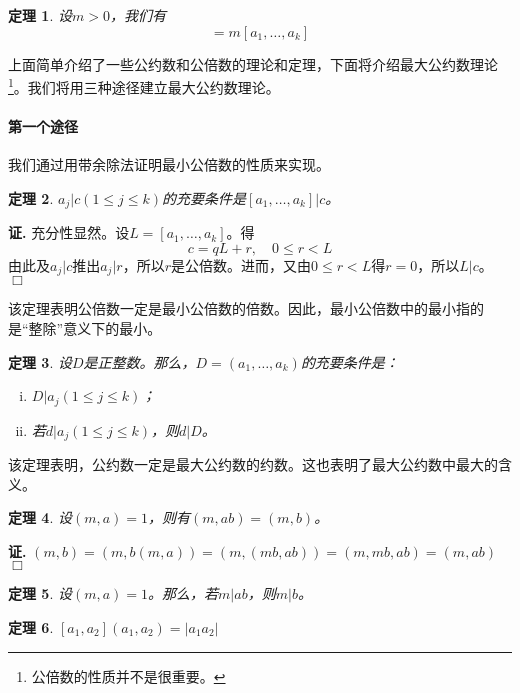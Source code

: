 \documentclass{ctexrep}
\newcommand{\aabs}[1]{{ \left| #1 \right| }}
\newtheorem{thrm}{定理}[section]
\renewenvironment{proof}[1][证]{\noindent \textbf{#1.} }{\hfill$\Box$}
\begin{document}
\begin{thrm}
设$m>0$，我们有
\begin{displaymath}
[ma_1,\dotsc,ma_k]=m[a_1,\dotsc,a_k]
\end{displaymath}
\end{thrm}

上面简单介绍了一些公约数和公倍数的理论和定理，下面将介绍最大公约数理论\footnote{公倍数的性质并不是很重要。}。我们将用三种途径建立最大公约数理论。

\paragraph{第一个途径}
我们通过用带余除法证明最小公倍数的性质来实现。

\begin{thrm}
$a_j|c(1\leq j\leq k)$的充要条件是$[a_1,\dotsc,a_k]|c$。
\end{thrm}
\begin{proof}
充分性显然。设$L=[a_1,\dotsc,a_k]$。得
\begin{displaymath}
c=qL+r,\quad 0\leq r<L
\end{displaymath}
由此及$a_j|c$推出$a_j|r$，所以$r$是公倍数。进而，又由$0\leq r<L$得$r=0$，所以$L|c$。
\end{proof}

该定理表明公倍数一定是最小公倍数的倍数。因此，最小公倍数中的最小指的是“整除”意义下的最小。

\begin{thrm}
设$D$是正整数。那么，$D=(a_1,\dotsc,a_k)$的充要条件是：
\begin{enumerate}[(i)]
\item $D|a_j(1\leq j\leq k)$；
\item 若$d|a_j(1\leq j\leq k)$，则$d|D$。
\end{enumerate}
\end{thrm}

该定理表明，公约数一定是最大公约数的约数。这也表明了最大公约数中最大的含义。

\begin{thrm}
设$(m,a)=1$，则有$(m,ab)=(m,b)$。
\end{thrm}
\begin{proof}
$(m,b)=(m,b(m,a))=(m,(mb,ab))=(m,mb,ab)=(m,ab)$
\end{proof}

\begin{thrm}
设$(m,a)=1$。那么，若$m|ab$，则$m|b$。
\end{thrm}

\begin{thrm}
$[a_1,a_2](a_1,a_2)=\aabs{a_1a_2}$
\end{thrm}
\end{document}
